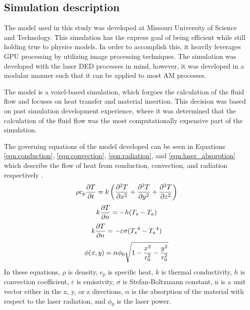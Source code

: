 \documentclass[pdflatex,sn-mathphys]{sn-jnl}
\begin{document}
	
	\subsection{Simulation description}
	\label{model_description}

	The model used in this study was developed at Missouri University of Science and Technology.
	This simulation has the express goal of being efficient while still holding true to physics models.  In order to accomplish this, it heavily leverages GPU processing by utilizing image processing techniques.  The simulation was developed with the laser \ac{DED} processes in mind, however, it was developed in a modular manner such that it can be applied to most \ac{AM} processes. 
	
	The model is a voxel-based simulation, which forgoes the calculation of the fluid flow and focuses on heat transfer and material insertion.  This decision was based on past simulation development experience, where it was determined that the calculation of the fluid flow was the most computationally expensive part of the simulation.   
	
	The governing equations of the model developed can be seen in Equations \ref{eqn:conduction}, \ref{eqn:convection}, \ref{eqn:radiation}, and \ref{eqn:laser_absorption} which describe the flow of heat from conduction, convection, and radiation respectively \cite{Han2012}.
		\begin{equation}
		\label{eqn:conduction}
		\centering
		\rho c_p \frac{\partial T}{\partial t}=k \left(\frac{\partial^2 T}{\partial x^2} +\frac{\partial^2 T}{\partial y^2}+\frac{\partial^2 T}{\partial z^2} \right)
		\end{equation}
			\begin{equation}
			\label{eqn:convection}
			\centering
			k \frac{\partial T}{\partial n}=-h (T_s-T_a)
			\end{equation}
				\begin{equation}
				\label{eqn:radiation}
				\centering
				k \frac{\partial T}{\partial n}=-\varepsilon \sigma ({T_s}^4-{T_a}^4)
				\end{equation}
					\begin{equation}
					\label{eqn:laser_absorption}
					\centering
					\phi(x,y) =\alpha \phi_0 \sqrt{1-\frac{x^2}{r_0^2} -\frac{y^2}{r_0^2}}
					\end{equation}
	In these equations, $\rho$ is density, $c_p$ is specific heat, $k$ is thermal conductivity, $h$ is convection coefficient, $\varepsilon$ is emissivity, $\sigma$ is Stefan-Boltzmann constant, n is a unit vector either in the x, y, or z directions, $\alpha$ is the absorption of the material with respect to the laser radiation, and $\phi_0$ is the laser power. 
	
\end{document}
